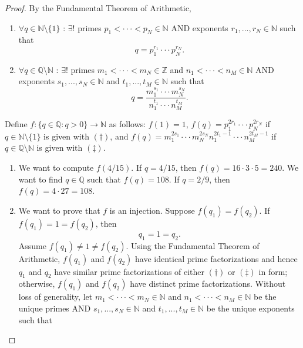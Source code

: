 \documentclass[12pt]{article}
\theoremstyle{definition}
\begin{document}
\begin{proof}
    By the Fundamental Theorem of Arithmetic,
    \begin{enumerate}[label=\arabic*)]
        \item $\forall q \in \mathbb{N}\setminus\{1\}$ : $\exists!$ primes $p_1 < \cdot \cdot \cdot < p_N \in \mathbb{N}$ AND exponents $r_1,...,r_N \in \mathbb{N}$ such that
        \begin{equation}
            q = p_1^{r_1} \cdot \cdot \cdot p_N^{r_N}.
            \tag{$\dagger$}
        \end{equation}
        \item $\forall q \in \mathbb{Q}\setminus\mathbb{N}$ : $\exists!$ primes $m_1 < \cdot \cdot \cdot < m_N \in \mathbb{Z}$ and $n_1 < \cdot \cdot \cdot < n_M \in \mathbb{N}$ AND exponents $s_1,...,s_N \in \mathbb{N}$ and $t_1,...,t_M \in \mathbb{N}$ such that
        \begin{equation}
            q = \frac{m_1^{s_1} \cdot \cdot \cdot m_N^{s_N}}{n_1^{t_1} \cdot \cdot \cdot n_M^{t_M}}.
            \tag{$\ddagger$}
        \end{equation}
    \end{enumerate}
    Define $f : \{q \in \mathbb{Q} : q > 0\} \to \mathbb{N}$ as follows: $f(1) = 1$, $f(q) = p_1^{2r_1} \cdot \cdot \cdot p_N^{2r_N}$ if $q \in \mathbb{N}\setminus\{1\}$ is given with $(\dagger)$, and $f(q) = m_1^{2s_1} \cdot \cdot \cdot m_N^{2s_N}n_1^{2t_1-1} \cdot \cdot \cdot n_M^{2t_M-1}$ if $q \in \mathbb{Q}\setminus\mathbb{N}$ is given with $(\ddagger)$. 
    \begin{enumerate}[label=\alph*)]
        \item We want to compute $f(4/15)$. If $q = 4/15$, then $f(q) = 16 \cdot 3 \cdot 5 = 240$. We want to find $q \in \mathbb{Q}$ such that $f(q) = 108$. If $q = 2/9$, then $f(q) = 4 \cdot 27 = 108$.
        \item We want to prove that $f$ is an injection. Suppose $f(q_1) = f(q_2)$. If $f(q_1) = 1 = f(q_2)$, then
        \[
            q_1 = 1 = q_2.
        \]
        Assume $f(q_1) \neq 1 \neq f(q_2)$. Using the Fundamental Theorem of Arithmetic, $f(q_1)$ and $f(q_2)$ have identical prime factorizations and hence $q_1$ and $q_2$ have similar prime factorizations of either $(\dagger)$ or $(\ddagger)$ in form; otherwise, $f(q_1)$ and $f(q_2)$ have distinct prime factorizations. Without loss of generality, let $m_1 < \cdot \cdot \cdot < m_N \in \mathbb{N}$ and $n_1 < \cdot \cdot \cdot < n_M \in \mathbb{N}$ be the unique primes AND $s_1,...,s_N \in \mathbb{N}$ and $t_1,...,t_M \in \mathbb{N}$ be the unique exponents such that

\end{enumerate}
\end{proof}
\end{document}

